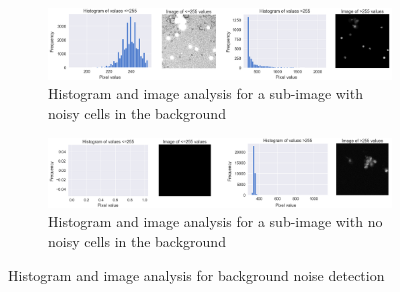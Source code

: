 \begin{figure}[h!]
    \centering
    \begin{subfigure}[h!]{0.99\textwidth}
        \includegraphics[width=\textwidth]{dissertation/figures/background_noise_true.png}
        \caption{Histogram and image analysis for a sub-image with noisy cells in the background}
        \label{fig:bgnoisetrue}
    \end{subfigure}

    \begin{subfigure}[h!]{0.99\textwidth}
        \includegraphics[width=\textwidth]{dissertation/figures/background_noise_false.png}
        \caption{Histogram and image analysis for a sub-image with no noisy cells in the background}
        \label{fig:bgnoisefalse}
    \end{subfigure}

    \caption{Histogram and image analysis for background noise detection}
    \label{fig:bgnoise}

\end{figure}

